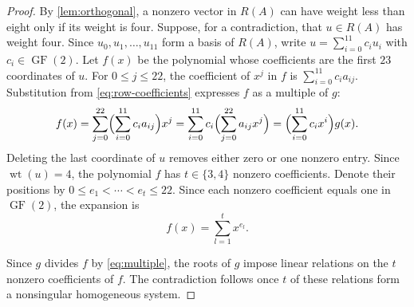 \documentclass[11pt]{article}
\numberwithin{equation}{section}
\DeclareMathOperator{\GF}{GF}
\DeclareMathOperator{\wt}{wt}
\begin{document}
\begin{proof}
By \autoref{lem:orthogonal}, a nonzero vector in $R(A)$ can have
weight less than eight only if its weight is four.
Suppose, for a contradiction, that $u\in R(A)$ has weight four.
Since $u_0,u_1,\ldots,u_{11}$ form a basis of $R(A)$, write
$u=\sum_{i=0}^{11}c_i u_i$ with $c_i\in\GF(2)$.
Let $f(x)$ be the polynomial whose coefficients are the first $23$
coordinates of $u$.
For $0\leq j\leq22$, the coefficient of $x^j$ in $f$ is
$\sum_{i=0}^{11}c_i a_{ij}$. Substitution from \eqref{eq:row-coefficients}
expresses $f$ as a multiple of $g$:
\begin{equation}\label{eq:multiple}
 f(x)=\sum_{j=0}^{22}\Bigl(\sum_{i=0}^{11}c_i a_{ij}\Bigr)x^j=\sum_{i=0}^{11}c_i\Bigl(\sum_{j=0}^{22}a_{ij}x^j\Bigr)=\Bigl(\sum_{i=0}^{11}c_i x^i\Bigr)g(x).
\end{equation}
Deleting the last coordinate of $u$ removes either zero or one nonzero
entry. Since $\wt(u)=4$, the polynomial $f$ has $t\in\{3,4\}$ nonzero
coefficients. Denote their positions by $0\leq e_1<\cdots<e_t\leq22$.
Since each nonzero coefficient equals one in $\GF(2)$, the expansion is
\begin{equation}\label{eq:sparse-expansion}
 f(x)=\sum_{l=1}^{t}x^{e_l}.
\end{equation}

Since $g$ divides $f$ by \eqref{eq:multiple}, the roots of $g$ impose
linear relations on the $t$ nonzero coefficients of $f$. The contradiction
follows once $t$ of these relations form a nonsingular homogeneous system.


\end{proof}
\end{document}

